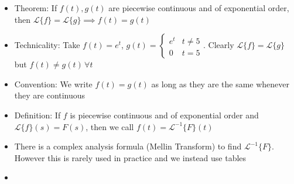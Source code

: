\documentclass[12pt]{article}
\begin{document}
\begin{itemize}
    \item Theorem: If $f(t), g(t)$ are piecewise continuous and of exponential order, then $\mathcal{L} \{f\} = \mathcal{L} \{g\} \implies f(t) = g(t)$
    \item Technicality: Take $f(t) = e^t$, $g(t) = \begin{cases} 
        e^t & t \neq 5 \\
        0 & t = 5  
     \end{cases}$. Clearly $\mathcal{L} \{f\} = \mathcal{L} \{g\}$ but $f(t) \neq g(t) \, \forall t$
     \item Convention: We write $f(t) = g(t)$ as long as they are the same whenever they are continuous
     \item Definition: If $f$ is piecewise continuous and of exponential order and $\mathcal{L} \{f\} (s) = F(s)$, then we call $f(t) = \mathcal{L}^{-1} \{F\} (t)$
     \item There is a complex analysis formula (Mellin Transform) to find $\mathcal{L}^{-1} \{F\}$. However this is rarely used in practice and we instead use tables
     \item 
\end{itemize}
\end{document}
